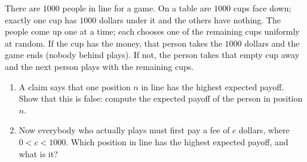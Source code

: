 There are $1000$ people in line for a game. On a table are $1000$ cups face down; exactly one cup has $1000$ dollars under it and the others have nothing. The people come up one at a time; each chooses one of the remaining cups uniformly at random. If the cup has the money, that person takes the $1000$ dollars and the game ends (nobody behind plays). If not, the person takes that empty cup away and the next person plays with the remaining cups.
\begin{enumerate}
\item[(a)] A claim says that one position $n$ in line has the highest expected payoff. Show that this is false: compute the expected payoff of the person in position $n$.
\item[(b)] Now everybody who actually plays must first pay a fee of $c$ dollars, where $0<c<1000$. Which position in line has the highest expected payoff, and what is it?
\end{enumerate}

